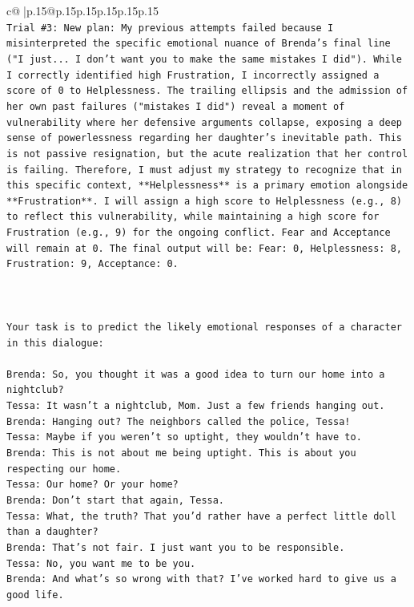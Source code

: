\documentclass{article}
\begin{document}
{\begin{supertabular}{c@{$\;$}|p{.15\linewidth}@{}p{.15\linewidth}p{.15\linewidth}p{.15\linewidth}p{.15\linewidth}p{.15\linewidth}}
{{{\\ 
\texttt{Trial \#3: New plan: My previous attempts failed because I misinterpreted the specific emotional nuance of Brenda's final line ("I just... I don't want you to make the same mistakes I did"). While I correctly identified high Frustration, I incorrectly assigned a score of 0 to Helplessness. The trailing ellipsis and the admission of her own past failures ("mistakes I did") reveal a moment of vulnerability where her defensive arguments collapse, exposing a deep sense of powerlessness regarding her daughter's inevitable path. This is not passive resignation, but the acute realization that her control is failing. Therefore, I must adjust my strategy to recognize that in this specific context, **Helplessness** is a primary emotion alongside **Frustration**. I will assign a high score to Helplessness (e.g., 8) to reflect this vulnerability, while maintaining a high score for Frustration (e.g., 9) for the ongoing conflict. Fear and Acceptance will remain at 0. The final output will be: Fear: 0, Helplessness: 8, Frustration: 9, Acceptance: 0.} \\
\\ 
\\ 
\\ 
\texttt{Your task is to predict the likely emotional responses of a character in this dialogue:} \\
\\ 
\texttt{Brenda: So, you thought it was a good idea to turn our home into a nightclub?} \\
\texttt{Tessa: It wasn't a nightclub, Mom. Just a few friends hanging out.} \\
\texttt{Brenda: Hanging out? The neighbors called the police, Tessa!} \\
\texttt{Tessa: Maybe if you weren't so uptight, they wouldn't have to.} \\
\texttt{Brenda: This is not about me being uptight. This is about you respecting our home.} \\
\texttt{Tessa: Our home? Or your home?} \\
\texttt{Brenda: Don't start that again, Tessa.} \\
\texttt{Tessa: What, the truth? That you'd rather have a perfect little doll than a daughter?} \\
\texttt{Brenda: That's not fair. I just want you to be responsible.} \\
\texttt{Tessa: No, you want me to be you.} \\
\texttt{Brenda: And what's so wrong with that? I've worked hard to give us a good life.} \\
}}}
\end{supertabular}}
\end{document}
